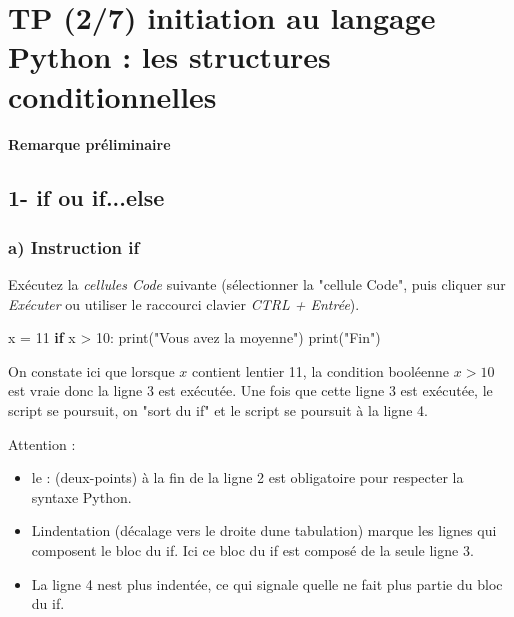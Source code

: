 \documentclass[
  paper=a4,
  ,captions=tableheading
]{scrartcl}
\author{}
\date{}
\title{}
\author{}
\date{}
\newenvironment{Shaded}{}{}
\newcommand{\BuiltInTok}[1]{\textcolor[rgb]{0.00,0.50,0.00}{#1}}
\newcommand{\ControlFlowTok}[1]{\textcolor[rgb]{0.00,0.44,0.13}{\textbf{#1}}}
\newcommand{\DecValTok}[1]{\textcolor[rgb]{0.25,0.63,0.44}{#1}}
\newcommand{\NormalTok}[1]{#1}
\newcommand{\OperatorTok}[1]{\textcolor[rgb]{0.40,0.40,0.40}{#1}}
\newcommand{\StringTok}[1]{\textcolor[rgb]{0.25,0.44,0.63}{#1}}
\providecommand{\tightlist}{%
  \setlength{\itemsep}{0pt}\setlength{\parskip}{0pt}}
\begin{document}




\hypertarget{tp-27-initiation-au-langage-python--les-structures-conditionnelles}{%
\section{TP (2/7) initiation au langage Python : les structures
conditionnelles}\label{tp-27-initiation-au-langage-python--les-structures-conditionnelles}}

\textbf{Remarque préliminaire}

\hypertarget{1--if-ou-ifelse}{%
\subsection{1- if ou if...else}\label{1--if-ou-ifelse}}

\hypertarget{a-instruction-if}{%
\subsubsection{a) Instruction if}\label{a-instruction-if}}

Exécutez la \emph{cellules Code} suivante (sélectionner la "cellule
Code", puis cliquer sur \emph{Exécuter} ou utiliser le raccourci clavier
\emph{CTRL + Entrée}).

\begin{Shaded}
\begin{Highlighting}[]
\NormalTok{x }\OperatorTok{=} \DecValTok{11}
\ControlFlowTok{if}\NormalTok{ x }\OperatorTok{\textgreater{}} \DecValTok{10}\NormalTok{:}
    \BuiltInTok{print}\NormalTok{(}\StringTok{"Vous avez la moyenne"}\NormalTok{)}
\BuiltInTok{print}\NormalTok{(}\StringTok{"Fin"}\NormalTok{)}
\end{Highlighting}
\end{Shaded}

On constate ici que lorsque \(x\) contient l\textquotesingle entier 11,
la condition booléenne \(x>10\) est vraie donc la ligne 3 est exécutée.
Une fois que cette ligne 3 est exécutée, le script se poursuit, on "sort
du if" et le script se poursuit à la ligne 4.

Attention :

\begin{itemize}
\tightlist
\item
  le : (deux-points) à la fin de la ligne 2 est obligatoire pour
  respecter la syntaxe Python.
\item
  L\textquotesingle indentation (décalage vers le droite
  d\textquotesingle une tabulation) marque les lignes qui composent le
  bloc du if. Ici ce bloc du if est composé de la seule ligne 3.
\item
  La ligne 4 n\textquotesingle est plus indentée, ce qui signale
  qu\textquotesingle elle ne fait plus partie du bloc du if.
\end{itemize}
\end{document}
